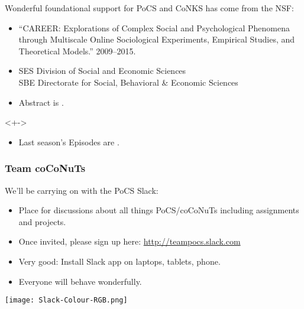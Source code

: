 \begin{frame}

  \begin{block}{Wonderful foundational support for PoCS and CoNKS has come from the NSF:}
    \begin{itemize}
    \item 
    ``CAREER: Explorations of Complex Social and Psychological
    Phenomena through Multiscale Online Sociological Experiments,
    Empirical Studies, and Theoretical Models.'' 2009--2015.
    \item 
      SES Division of Social and Economic Sciences\\
      SBE Directorate for Social, Behavioral \& Economic Sciences
    \item 
      Abstract is .
    \end{itemize}
  \end{block}


  \begin{block}<+->{}
    \begin{itemize}
    \item
      Last season's Episodes are .
    \end{itemize}
  \end{block}

\end{frame}

\begin{frame}
  \frametitle{Team coCoNuTs}

  \begin{block}{We'll be carrying on with the PoCS Slack:}
    \begin{itemize}
    \item<+-> 
      Place for discussions about all things PoCS/coCoNuTs
      including assignments and projects.
    \item<+-> 
      Once invited, please sign up here:
      \href{http://teampocs.slack.com}{http://teampocs.slack.com}
    \item<+->
      Very good: Install Slack app on laptops, tablets, phone.
    \item<+->
      Everyone will behave wonderfully.
    \end{itemize}    

  \texttt{[image: Slack-Colour-RGB.png]}

  \end{block}

\end{frame}

